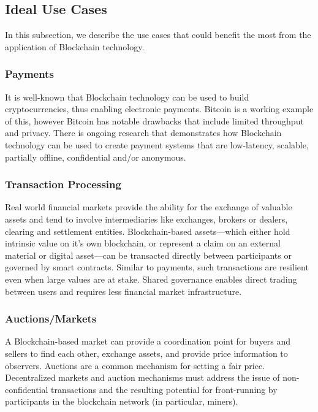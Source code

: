
\subsection{Ideal Use Cases}
In this subsection, we describe the use cases that could benefit the most from the application of Blockchain technology.

\subsubsection{Payments}
It is well-known that Blockchain technology can be used to build cryptocurrencies, thus enabling electronic payments.
Bitcoin is a working example of this, however Bitcoin has notable drawbacks that include limited throughput and privacy.
There is ongoing research that demonstrates how Blockchain technology can be used to create payment systems that are low-latency, scalable, partially offline, confidential and/or anonymous.

\subsubsection{Transaction Processing} 
Real world financial markets provide the ability for the exchange of valuable assets and tend to involve intermediaries like exchanges, brokers or dealers, clearing and settlement entities. 
Blockchain-based assets---which either hold intrinsic value on it's own blockchain, or represent a claim on an external material or digital asset---can be transacted directly between participants or governed by smart contracts.
Similar to payments, such transactions are resilient even when large values are at stake.
Shared governance enables direct trading between users and requires less financial market infrastructure.  

\subsubsection{Auctions/Markets}
A Blockchain-based market can provide a coordination point for buyers and sellers to find each other, exchange assets, and provide price information to observers. 
Auctions are a common mechanism for setting a fair price. 
Decentralized markets and auction mechanisms must address the issue of non-confidential transactions and the resulting potential for front-running by participants in the blockchain network (in particular, miners).

